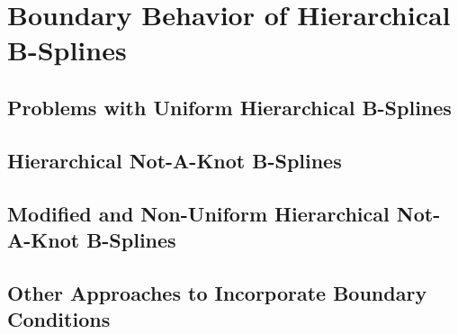 \section{Boundary Behavior of Hierarchical B-Splines}
\label{sec:23boundary}


\blindtext{}

\subsection{Problems with Uniform Hierarchical B-Splines}


\blindtext{}

\subsection{Hierarchical Not-A-Knot B-Splines}


\blindtext{}

\subsection{Modified and Non-Uniform Hierarchical Not-A-Knot B-Splines}


\blindtext{}

\subsection{Other Approaches to Incorporate Boundary Conditions}


\blindtext{}
